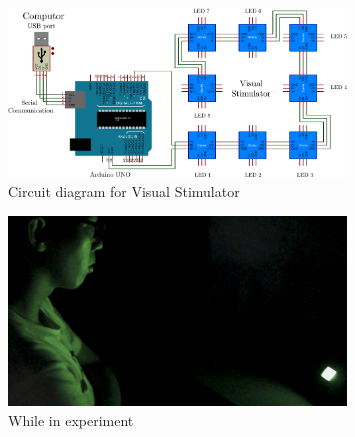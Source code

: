 \begin{figure}[H]
	\centering
	\includegraphics[width=0.8\textwidth]{chapter6/arduinosheet.pdf}
	\caption{Circuit diagram for Visual Stimulator}
\end{figure}
\begin{figure}[H]
	\centering
	\includegraphics[width=0.8\textwidth]{chapter6/experi.jpg}
	\caption{While in experiment}
\end{figure}
\pagebreak
